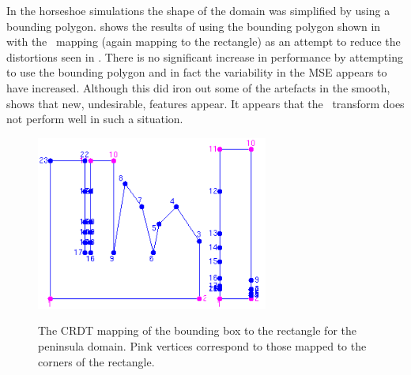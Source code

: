 In the horseshoe simulations the shape of the domain was simplified by using a bounding polygon.  shows the results of using the bounding polygon shown in  with the \sch\ mapping (again mapping to the rectangle) as  an attempt to reduce the distortions seen in . There is no significant increase in performance by attempting to use the bounding polygon and in fact the variability in the MSE appears to have increased. Although this did iron out some of the artefacts in the smooth,  shows that new, undesirable, features appear. It appears that the \sch\ transform does not perform well in such a situation.

\begin{figure}[t]
\centering
\includegraphics[width=3in]{sc/figs/wigglytop2-bbox-numbered.png} \\
\caption{The CRDT mapping of the bounding box to the rectangle for the peninsula domain. Pink vertices correspond to those mapped to the corners of the rectangle.}
\label{wigglytop2-bbox-numbered}
\end{figure}


